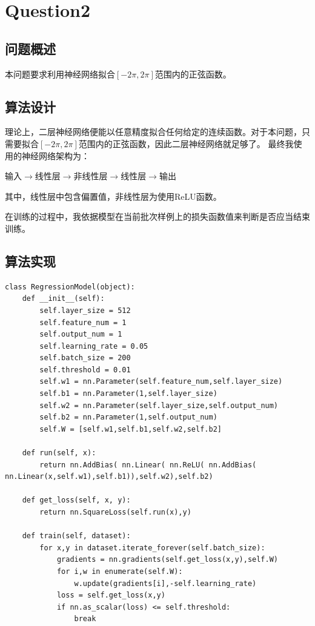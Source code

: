 \chapter{Question2}
\section{问题概述}
%
%
本问题要求利用神经网络拟合$[-2\pi,2\pi]$范围内的正弦函数。

%
%

%
%

\section{算法设计}
%
%
理论上，二层神经网络便能以任意精度拟合任何给定的连续函数。对于本问题，只需要拟合$[-2\pi,2\pi]$范围内的正弦函数，因此二层神经网络就足够了。
最终我使用的神经网络架构为：
\begin{center}
    输入$\rightarrow$线性层$\rightarrow$非线性层$\rightarrow$线性层$\rightarrow$输出
\end{center}
其中，线性层中包含偏置值，非线性层为使用ReLU函数。

在训练的过程中，我依据模型在当前批次样例上的损失函数值来判断是否应当结束训练。
\section{算法实现}
%
%

\begin{lstlisting}[emph={[3]dataset,x,y},emphstyle={[3]\color{vscode_parametercolor}},emph={[4]RegressionModel,GameState,MinimaxAgent,AlphaBetaAgent},emphstyle={[4]\color{vscode_classcolor}}]
class RegressionModel(object):
    def __init__(self):
        self.layer_size = 512
        self.feature_num = 1
        self.output_num = 1
        self.learning_rate = 0.05
        self.batch_size = 200
        self.threshold = 0.01
        self.w1 = nn.Parameter(self.feature_num,self.layer_size)
        self.b1 = nn.Parameter(1,self.layer_size)
        self.w2 = nn.Parameter(self.layer_size,self.output_num)
        self.b2 = nn.Parameter(1,self.output_num)
        self.W = [self.w1,self.b1,self.w2,self.b2]

    def run(self, x):
        return nn.AddBias( nn.Linear( nn.ReLU( nn.AddBias( nn.Linear(x,self.w1),self.b1)),self.w2),self.b2)

    def get_loss(self, x, y):
        return nn.SquareLoss(self.run(x),y)

    def train(self, dataset):
        for x,y in dataset.iterate_forever(self.batch_size):
            gradients = nn.gradients(self.get_loss(x,y),self.W)
            for i,w in enumerate(self.W):
                w.update(gradients[i],-self.learning_rate)
            loss = self.get_loss(x,y)
            if nn.as_scalar(loss) <= self.threshold:
                break

\end{lstlisting}

